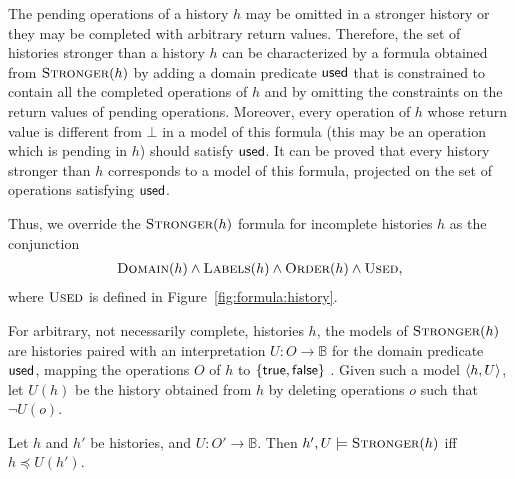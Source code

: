 The pending operations of a history $h$ may be omitted in a stronger history or
they may be completed with arbitrary return values. 
Therefore, 
the set of histories stronger than a history $h$
can be characterized by a formula obtained from $\textsc{Stronger}(h)$ by
adding a domain predicate ${\sf used}$ that is constrained to contain all the
completed operations of $h$ and by omitting the constraints on the return
values of pending operations. Moreover, every operation of $h$ whose return
value is different from $\bot$ in a model of this formula (this may be an
operation which is pending in $h$) should satisfy ${\sf used}$. It can be
proved that every history stronger than $h$ corresponds to a model of this
formula, projected on the set of operations satisfying ${\sf used}$.

Thus, we override the $\textsc{Stronger}(h)$ formula for incomplete histories
$h$ as the conjunction
\begin{align*}
  \textsc{Domain}(h) \land \textsc{Labels}(h) \land \textsc{Order}(h) \land \textsc{Used},
\end{align*}
where $\textsc{Used}$ is defined in Figure~\ref{fig:formula:history}.



For arbitrary, not necessarily complete, histories $h$, the models of
$\textsc{Stronger}(h)$ are histories paired with an interpretation $U : O \to
\mathbb{B}$ for the domain predicate ${\sf used}$, mapping the operations $O$ of
$h$ to ${\{ \sf true, false \}}$ . Given such a model ${\langle{h,U}\rangle}$, let $U(h)$ be
the history obtained from $h$ by deleting operations $o$ such that $\lnot U(o)$.

\begin{lemma}
  \label{lem:stronger_form_pending}

  Let $h$ and $h'$ be histories, and $U : O' \to \mathbb{B}$.
  Then $h', U \models \textsc{Stronger}(h)$ if{f} $h \preceq U(h')$.

\end{lemma}

